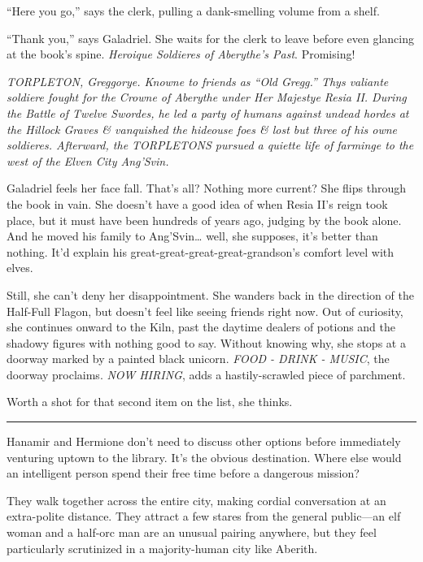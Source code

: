 \documentclass[smalldemyvopaper,11pt,twoside,onecolumn,openright,extrafontsizes]{memoir}
\begin{document}
``Here you go,'' says the clerk, pulling a dank-smelling volume from a
shelf.

``Thank you,'' says Galadriel. She waits for the clerk to leave before
even glancing at the book's spine. \emph{Heroique Soldieres of
Aberythe's Past}. Promising!

\emph{TORPLETON, Greggorye. Knowne to friends as ``Old Gregg.'' Thys
valiante soldiere fought for the Crowne of Aberythe under Her Majestye
Resia II. During the Battle of Twelve Swordes, he led a party of humans
against undead hordes at the Hillock Graves \& vanquished the hideouse
foes \& lost but three of his owne soldieres. Afterward, the TORPLETONS
pursued a quiette life of farminge to the west of the Elven City
Ang'Svin.}

Galadriel feels her face fall. That's all? Nothing more current? She
flips through the book in vain. She doesn't have a good idea of when
Resia II's reign took place, but it must have been hundreds of years
ago, judging by the book alone. And he moved his family to
Ang'Svin\ldots{} well, she supposes, it's better than nothing. It'd
explain his great-great-great-great-grandson's comfort level with elves.

Still, she can't deny her disappointment. She wanders back in the
direction of the Half-Full Flagon, but doesn't feel like seeing friends
right now. Out of curiosity, she continues onward to the Kiln, past the
daytime dealers of potions and the shadowy figures with nothing good to
say. Without knowing why, she stops at a doorway marked by a painted
black unicorn. \emph{FOOD - DRINK - MUSIC}, the doorway proclaims.
\emph{NOW HIRING}, adds a hastily-scrawled piece of parchment.

Worth a shot for that second item on the list, she thinks.

\begin{center}\rule{0.5\linewidth}{\linethickness}\end{center}

Hanamir and Hermione don't need to discuss other options before
immediately venturing uptown to the library. It's the obvious
destination. Where else would an intelligent person spend their free
time before a dangerous mission?

They walk together across the entire city, making cordial conversation
at an extra-polite distance. They attract a few stares from the general
public---an elf woman and a half-orc man are an unusual pairing
anywhere, but they feel particularly scrutinized in a majority-human
city like Aberith.
\end{document}
